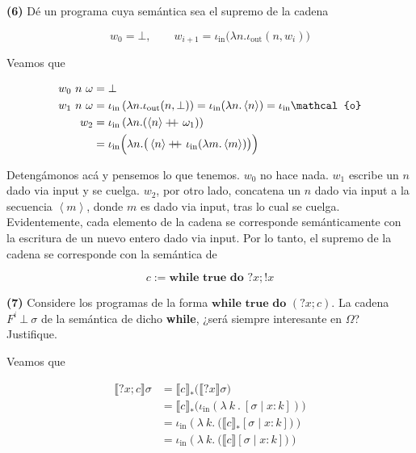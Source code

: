 \documentclass[a4paper, 12pt]{article}
\newcommand\doubleplus{+\kern-1.3ex+\kern0.8ex}
\begin{document}
\pagebreak 

\begin{myframe}
  \textbf{(6)} Dé un programa cuya semántica sea el supremo de la cadena 

  \begin{equation*}
    w_0 = \bot , \qquad w_{i+1} = \iota_{\text{in}} \big( \lambda n.
    \iota_{\text{out}} \left( n, w_i \right)  \big)
  \end{equation*}
\end{myframe}


Veamos que 

\begin{align*}
  w_0 ~ n ~ \omega&= \bot  \\ 
  w_1 ~ n ~ \omega&= \iota_{\text{in}} \left( \lambda n.\iota_\text{out}(n, \bot ) \right) =
  \iota_{\text{in}} (\lambda n . \left<n \right>) = \iota_{\text{in}} \mathcal{o}\\ 
  w_2 &= \iota_{\text{in}}\left( \lambda n. (\left<n \right>  \doubleplus
  \omega_1)\right) \\
      &= \iota_{\text{in}}\Big( \lambda n.\big(\left<n \right>
  \doubleplus \iota_{\text{in}}(\lambda m . \left<m \right>)\big) \Big) 
\end{align*}

Detengámonos acá y pensemos lo que tenemos. $w_0$ no hace nada. $w_1$ escribe un
$n$ dado via input y se cuelga. $w_2$, por otro lado, concatena un $n$ dado via
input a la secuencia $\left< m \right>$, donde $m$ es dado via input, tras lo
cual se cuelga. Evidentemente, cada elemento de la cadena se corresponde
semánticamente con la escritura de un nuevo entero dado via input. Por lo tanto,
el supremo de la cadena se corresponde con la semántica de 

\begin{equation*}
  c := \textbf{while } \textbf{true} \textbf{ do } ?x;!x
\end{equation*}

\pagebreak 

\begin{myframe}
  \textbf{(7)} Considere los programas de la forma $\textbf{while true do } (?x;c)$. La
  cadena $F^i ~ \bot ~\sigma$ de la semántica de dicho \textbf{while}, ¿será
  siempre interesante en $\Omega$? Justifique.
\end{myframe}

Veamos que 

\begin{align*}
  \llbracket ?x;c \rrbracket \sigma
  &= \llbracket c \rrbracket_* \big( \llbracket ?x \rrbracket\sigma \big) \\ 
  &= \llbracket c \rrbracket_* \big( \iota_{\text{in}}\left( \lambda
  ~k~.~[\sigma \mid x : k] \right)  \big) \\ 
  &= \iota_{\text{in}} \left( \lambda ~ k . ~ \big( \llbracket c
  \rrbracket_*[\sigma \mid x : k] \big) \right) \\
  &= \iota_{\text{in}} \left( \lambda ~ k . ~ \big( \llbracket c
  \rrbracket[\sigma \mid x : k] \big) \right) 
\end{align*}
\end{document}
